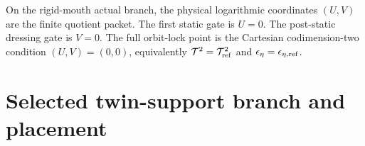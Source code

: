 \begin{theorem}
\label{thm:part07-cartesian-orbit-lock}
On the rigid-mouth actual branch, the physical logarithmic coordinates \((U,V)\) are the finite quotient packet.  The first static gate is \(U=0\).  The post-static dressing gate is \(V=0\).  The full orbit-lock point is the Cartesian codimension-two condition \((U,V)=(0,0)\), equivalently \(\mathcal T^2=\mathcal T_{\rm ref}^2\) and \(\epsilon_\eta=\epsilon_{\eta,\rm ref}\).
\end{theorem}


\section{Selected twin-support branch and placement}
\label{sec:part07_same_charge_rigid_mouth:selected-twin-support-branch-and-placement}


